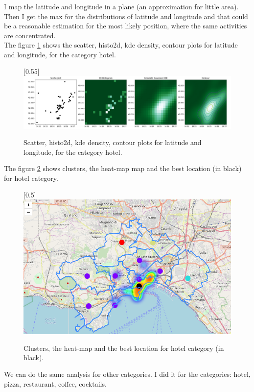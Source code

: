 \documentclass[a4paper, 12pt, oneside]{book}
\begin{document}
I map the latitude and longitude in a plane (an approximation for little area). Then I get the max for the distributions of latitude and longitude and that could be a reasonable estimation for the most likely position, where the same activities are concentrated.\\

The figure \ref{fig:hotel_density} shows the scatter, histo2d, kde density, contour plots for latitude and longitude, for the category hotel.


\begin{figure}[!htb]
		\centering
		\scalebox{0.5}[0.55]{\includegraphics{immagini/hotel_density.png}}
		\caption{Scatter, histo2d, kde density, contour plots for latitude and longitude, for the category hotel.}
		\label{fig:hotel_density}
	\end{figure}
\clearpage
The figure \ref{fig:hotel_map} shows clusters, the heat-map map and the best location (in black) for hotel category.

\begin{figure}[!htb]
		\centering
		\scalebox{0.45}[0.5]{\includegraphics{immagini/hotel_map.png}}
		\caption{Clusters, the heat-map and the best location for hotel category (in black).}
		\label{fig:hotel_map}
	\end{figure}

We can do the same analysis for other categories. I did it for the categories: hotel, pizza, restaurant, coffee, cocktails.\\
\end{document}
